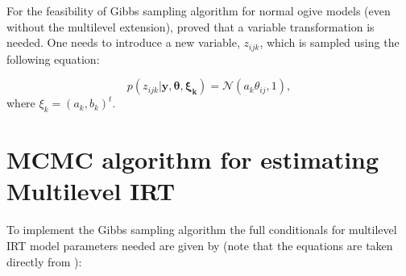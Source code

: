 \documentclass[12pt]{article}
\begin{document}
For the feasibility of Gibbs sampling algorithm for normal ogive models (even without the multilevel extension), \cite{albert1992bayesian} proved that a variable transformation is needed. One needs to introduce a new variable, $z_{ijk}$, which is sampled using the following equation:

\begin{equation*}
    p(z_{ijk}| \boldsymbol{y, \theta, \xi_k}) = \mathcal{N}(a_k \theta_{ij}, 1),
\end{equation*}
where $\xi_k = (a_k, b_k)^t.$


\section{MCMC algorithm for estimating Multilevel IRT}  \label{sec:full_conditionals_mlirt}
To implement the Gibbs sampling algorithm the full conditionals for multilevel IRT model parameters needed are given by (note that the equations are taken directly from \cite{fox2007multilevel}):
\end{document}
